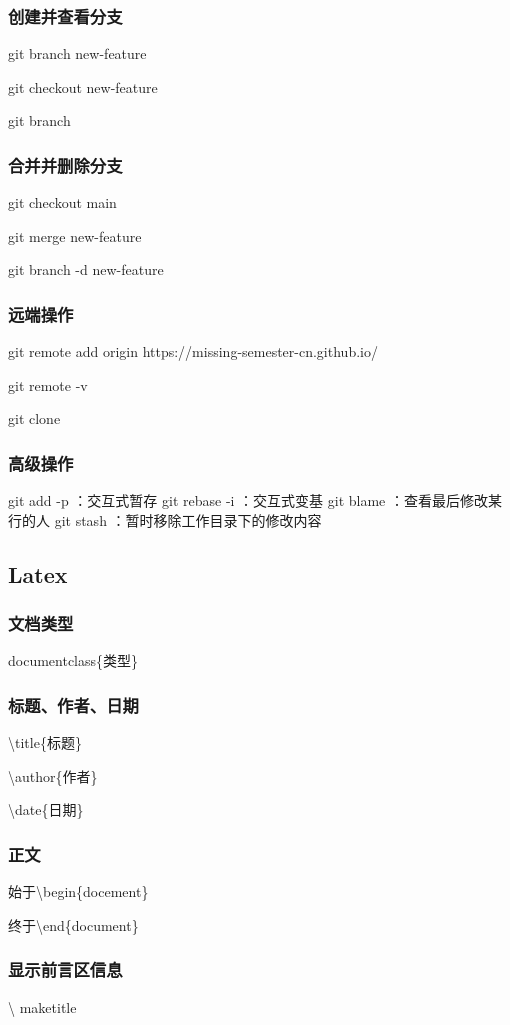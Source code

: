 \documentclass{ctexart}
\begin{document}
\subsubsection{创建并查看分支}
git branch new-feature

git checkout new-feature 

git branch 
\subsubsection{合并并删除分支}
git checkout main

git merge new-feature 

git branch -d new-feature 
\subsubsection{远端操作}
git remote add origin https://missing-semester-cn.github.io/

git remote -v 

git clone 
\subsubsection{高级操作}
git add -p ：交互式暂存
git rebase -i ：交互式变基
git blame  ：查看最后修改某行的人 
git stash  ：暂时移除工作目录下的修改内容 
\subsection{Latex}
\subsubsection{文档类型}
documentclass\{类型\}
\subsubsection{标题、作者、日期}
\textbackslash{}title\{标题\}

\textbackslash{}author\{作者\}

\textbackslash{}date\{日期\}
\subsubsection{正文}
始于\textbackslash{}begin\{docement\}

终于\textbackslash{}end\{document\}
\subsubsection{显示前言区信息}
\textbackslash{} maketitle
\end{document}
